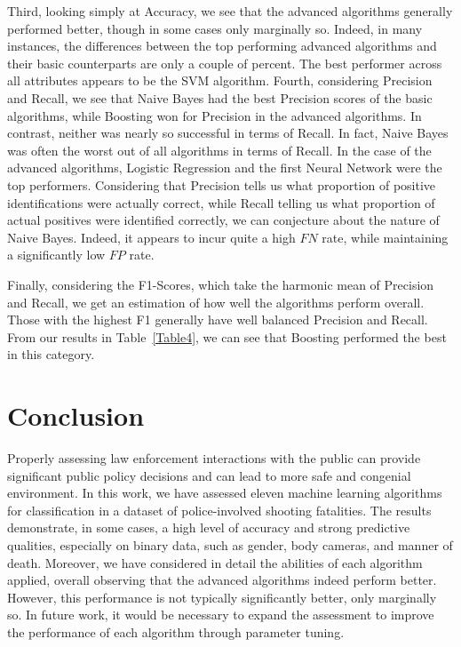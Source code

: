 \documentclass[10pt, conference, compsocconf]{IEEEtran}
\begin{document}
Third, looking simply at Accuracy, we see that the advanced algorithms generally performed better, though in some cases only marginally so. Indeed, in many instances, the differences between the top performing advanced algorithms and their basic counterparts are only a couple of percent. The best performer across all attributes appears to be the SVM algorithm. Fourth, considering Precision and Recall, we see that Naive Bayes had the best Precision scores of the basic algorithms, while Boosting won for Precision in the advanced algorithms. In contrast, neither was nearly so successful in terms of Recall. In fact, Naive Bayes was often the worst out of all algorithms in terms of Recall. In the case of the advanced algorithms, Logistic Regression and the first Neural Network were the top performers. Considering that Precision tells us what proportion of positive identifications were actually correct, while Recall telling us what proportion of actual positives were identified correctly, we can conjecture about the nature of Naive Bayes. Indeed, it appears to incur quite a high $FN$ rate, while maintaining a significantly low $FP$ rate.

Finally, considering the F1-Scores, which take the harmonic mean of Precision and Recall, we get an estimation of how well the algorithms perform overall. Those with the highest F1 generally have well balanced Precision and Recall. From our results in Table~\ref{Table4}, we can see that Boosting performed the best in this category.

\vspace{-0.01cm}
\section{Conclusion}\label{conclusion}
\vspace{-0.01cm}

Properly assessing law enforcement interactions with the public can provide significant public policy decisions and can lead to more safe and congenial environment. In this work, we have assessed eleven machine learning algorithms for classification in a dataset of police-involved shooting fatalities. The results demonstrate, in some cases, a high level of accuracy and strong predictive qualities, especially on binary data, such as gender, body cameras, and manner of death. Moreover, we have considered in detail the abilities of each algorithm applied, overall observing that the advanced algorithms indeed perform better. However, this performance is not typically significantly better, only marginally so. In future work, it would be necessary to expand the assessment to improve the performance of each algorithm through parameter tuning. 

%
%
\end{document}
